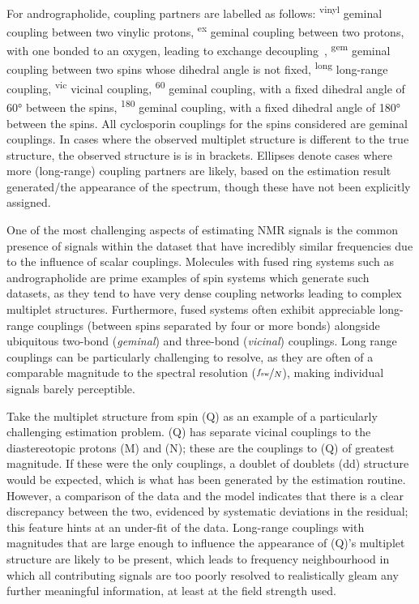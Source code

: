 \begin{table}
{    For andrographolide, coupling partners are labelled as follows:
    \textsuperscript{vinyl} geminal coupling between two vinylic protons,
    \textsuperscript{ex} geminal coupling between two protons, with one
    bonded to an oxygen, leading to exchange decoupling~\cite[Section
    2.6.1.5]{Claridge2016},
    \textsuperscript{gem} geminal coupling between two spins whose dihedral
    angle is not fixed,
    \textsuperscript{long} long-range coupling,
    \textsuperscript{vic} vicinal coupling,
    \textsuperscript{60} geminal coupling, with a fixed dihedral angle of
    \ang{60} between the spins,
    \textsuperscript{180} geminal coupling, with a fixed dihedral angle of
    \ang{180} between the spins.
    All cyclosporin couplings for the spins considered are geminal couplings.
    In cases where the observed multiplet structure is different to the true
    structure, the observed structure is is in brackets. Ellipses denote cases
    where more (long-range) coupling partners are likely, based on the
    estimation result generated/the appearance of the spectrum, though these
    have not been explicitly assigned.
}
\label{tab:andro-multiplets}
\end{table}

One of the most challenging aspects of estimating \ac{NMR} signals is
the common presence of signals within the dataset that have incredibly similar
frequencies due to the influence of scalar couplings.
Molecules with fused ring systems such as andrographolide are prime examples of spin
systems which generate such datasets, as they tend to have very dense coupling
networks leading to complex multiplet structures. Furthermore, fused systems often
exhibit appreciable long-range couplings (between spins separated by four or
more bonds) alongside ubiquitous two-bond (\emph{geminal}) and three-bond
(\emph{vicinal}) couplings. Long range couplings can be particularly challenging to
resolve, as they are often of a comparable magnitude to the spectral resolution
($\nicefrac{f_{\mathrm{sw}}}{N}$), making individual signals barely perceptible.

Take the multiplet structure from spin (Q) as an example of a particularly
challenging estimation problem.
(Q) has separate vicinal couplings to the
diastereotopic protons (M) and (N); these are the couplings to
(Q) of greatest magnitude. If these were the only couplings, a doublet of doublets
(dd) structure would be expected, which is what has been generated by
the estimation routine.
However, a comparison of the data and
the model indicates that there is a clear discrepancy between the two,
evidenced by systematic deviations in the residual; this feature hints at an
under-fit of the data.
Long-range couplings with magnitudes that are large enough to influence the
appearance of (Q)'s multiplet structure are likely to be present, which leads
to frequency neighbourhood in which all contributing signals are too poorly
resolved to realistically gleam any further meaningful information, at least at
the field strength used.

